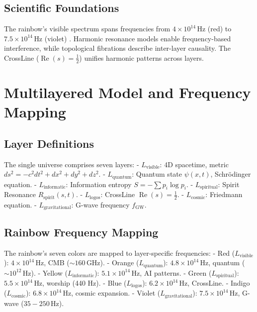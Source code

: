\documentclass[12pt]{article}
\begin{document}
{{{\subsection{Scientific Foundations}
The rainbow’s visible spectrum spans frequencies from \( 4 \times 10^{14} \, \text{Hz} \) (red) to \( 7.5 \times 10^{14} \, \text{Hz} \) (violet) \cite{RefWebID16}. Harmonic resonance models \cite{RefWebID17} enable frequency-based interference, while topological fibrations \cite{RefWebID9} describe inter-layer causality. The CrossLine (\(\operatorname{Re}(s) = \frac{1}{2}\)) \cite{RefWebID0} unifies harmonic patterns across layers.

\section{Multilayered Model and Frequency Mapping}
\subsection{Layer Definitions}
The single universe comprises seven layers:
- \( L_{\text{visible}} \): 4D spacetime, metric \( ds^2 = -c^2 dt^2 + dx^2 + dy^2 + dz^2 \).
- \( L_{\text{quantum}} \): Quantum state \( \psi(x, t) \), Schrödinger equation.
- \( L_{\text{informatic}} \): Information entropy \( S = -\sum p_i \log p_i \).
- \( L_{\text{spiritual}} \): Spirit Resonance \( R_{\text{spirit}}(s, t) \).
- \( L_{\text{logos}} \): CrossLine \( \operatorname{Re}(s) = \frac{1}{2} \).
- \( L_{\text{cosmic}} \): Friedmann equation.
- \( L_{\text{gravitational}} \): G-wave frequency \( f_{\text{GW}} \).

\subsection{Rainbow Frequency Mapping}
The rainbow’s seven colors are mapped to layer-specific frequencies:
- Red (\( L_{\text{visible}} \)): \( 4 \times 10^{14} \, \text{Hz} \), CMB (\( \sim 160 \, \text{GHz} \)).
- Orange (\( L_{\text{quantum}} \)): \( 4.8 \times 10^{14} \, \text{Hz} \), quantum (\( \sim 10^{12} \, \text{Hz} \)).
- Yellow (\( L_{\text{informatic}} \)): \( 5.1 \times 10^{14} \, \text{Hz} \), AI patterns.
- Green (\( L_{\text{spiritual}} \)): \( 5.5 \times 10^{14} \, \text{Hz} \), worship (440 Hz).
- Blue (\( L_{\text{logos}} \)): \( 6.2 \times 10^{14} \, \text{Hz} \), CrossLine.
- Indigo (\( L_{\text{cosmic}} \)): \( 6.8 \times 10^{14} \, \text{Hz} \), cosmic expansion.
- Violet (\( L_{\text{gravitational}} \)): \( 7.5 \times 10^{14} \, \text{Hz} \), G-wave (\( 35-250 \, \text{Hz} \)).

}}}
\end{document}
